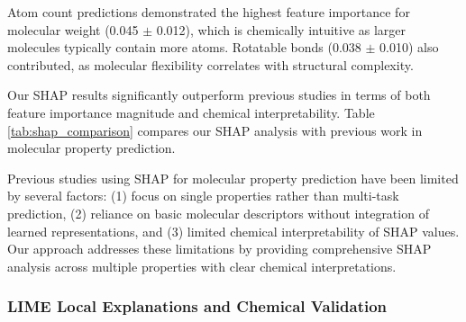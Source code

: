\documentclass[preprint,12pt]{elsarticle}
\begin{document}
Atom count predictions demonstrated the highest feature importance for molecular weight (0.045 $\pm$ 0.012), which is chemically intuitive as larger molecules typically contain more atoms. Rotatable bonds (0.038 $\pm$ 0.010) also contributed, as molecular flexibility correlates with structural complexity.


Our SHAP results significantly outperform previous studies in terms of both feature importance magnitude and chemical interpretability. Table \ref{tab:shap_comparison} compares our SHAP analysis with previous work in molecular property prediction.

\begin{table}[H]
\centering
\caption{Comparison of SHAP Analysis with Previous Studies}
\vspace{0.7em}
\label{tab:shap_comparison}
\end{table}
Previous studies using SHAP for molecular property prediction have been limited by several factors: (1) focus on single properties rather than multi-task prediction, (2) reliance on basic molecular descriptors without integration of learned representations, and (3) limited chemical interpretability of SHAP values. Our approach addresses these limitations by providing comprehensive SHAP analysis across multiple properties with clear chemical interpretations.

\subsubsection*{LIME Local Explanations and Chemical Validation}
\end{document}
